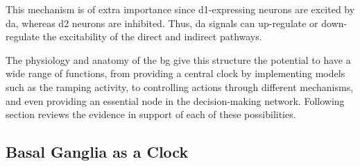 This mechanism is of extra importance since \gls{d1}-expressing neurons are excited by \gls{da}, whereas \gls{d2} neurons are inhibited.
Thus, \gls{da} signals can up-regulate or down-regulate the excitability of the direct and indirect pathways.
\par
The physiology and anatomy of the \gls{bg} give this structure the potential to have a wide range of functions, from providing a central clock by implementing models such as the ramping activity, to controlling actions through different mechanisms, and even providing an essential node in the decision-making network.
Following section reviews the evidence in support of each of these possibilities.


\subsection{Basal Ganglia as a Clock}
\label{ch:intro:BGTime}

